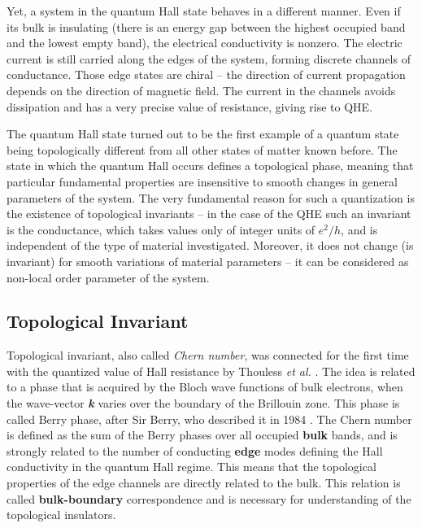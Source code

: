 \documentclass[titlepage,a4paper]{book}
\newcommand{\wciecie}{\quad\phantom{v}}
\begin{document}
Yet, a system in the quantum Hall state behaves in a different manner. Even if its bulk is insulating (there is an energy gap between the highest occupied band and the lowest empty band), the electrical conductivity is nonzero. The electric current is still carried along the edges of the system, forming discrete channels of conductance. Those edge states are chiral -- the direction of current propagation depends on the direction of magnetic field. The current in the channels avoids dissipation and has a very precise value of resistance, giving rise to QHE. %

The quantum Hall state turned out to be the first example of a quantum state being topologically different from all other states of matter known before. The state in which the quantum Hall occurs defines a topological phase, meaning that particular fundamental properties are insensitive to smooth changes in general parameters of the system. The very fundamental reason for such a quantization is the existence of topological invariants -- in the case of the QHE such an invariant is the conductance, which takes values only of integer units of $e^2/h$, and is independent of the type of material investigated. Moreover, it does not change (is invariant) for smooth variations of material parameters -- it can be considered as non-local order parameter of the system.  

\subsection{Topological Invariant}
\wciecie
Topological invariant, also called \textit{Chern number}, was connected for the first time with the quantized value of Hall resistance by Thouless \textit{et al.} \cite{Thouless_Topology}. The idea is related to a phase that is acquired by the Bloch wave functions of bulk electrons, when the wave-vector \textbf{\textit{k}} varies over the boundary of the Brillouin zone. This phase is called Berry phase, after Sir  Berry, who described it in 1984 \cite{Berry_phase}. The Chern number is defined as the sum of the Berry phases over all occupied \textbf{bulk} bands, and is strongly related to the number of conducting \textbf{edge} modes defining the Hall conductivity in the quantum Hall regime. This means that the topological properties of the edge channels are directly related to the bulk. This relation is called \textbf{bulk-boundary} correspondence and is necessary for understanding of the topological insulators.
\end{document}
